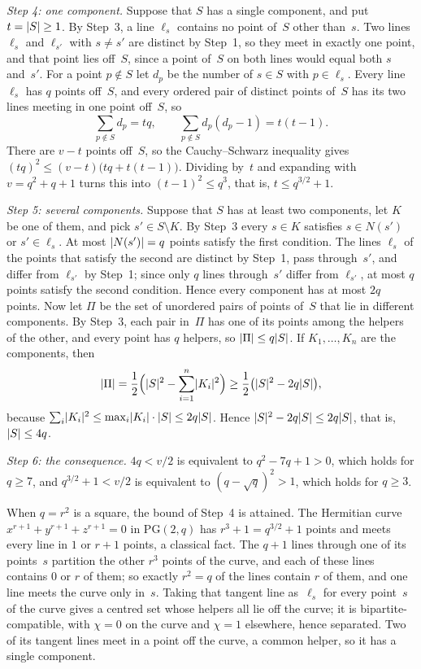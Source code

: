 \begin{outline}
\emph{Step 4: one component.} Suppose that $S$ has a single component, and put $t=\lvert S \rvert\ge1$. By Step~3, a line
$\ell_s$ contains no point of~$S$ other than~$s$. Two lines $\ell_s$ and $\ell_{s'}$ with $s\ne s'$ are distinct by
Step~1, so they meet in exactly one point, and that point lies off~$S$, since a point of~$S$ on both lines would equal
both $s$ and~$s'$. For a point $p\notin S$ let $d_p$ be the number of $s\in S$ with $p\in\ell_s$. Every line $\ell_s$ has
$q$ points off~$S$, and every ordered pair of distinct points of~$S$ has its two lines meeting in one point off~$S$, so
\[
 \sum_{p\notin S}d_p=tq,\qquad\sum_{p\notin S}d_p(d_p-1)=t(t-1).
\]
There are $v-t$ points off~$S$, so the Cauchy--Schwarz inequality gives $(tq)^2\le(v-t)\bigl(tq+t(t-1)\bigr)$. Dividing
by~$t$ and expanding with $v=q^2+q+1$ turns this into $(t-1)^2\le q^3$, that is, $t\le q^{3/2}+1$.

\emph{Step 5: several components.} Suppose that $S$ has at least two components, let $K$ be one of them, and pick
$s'\in S\setminus K$. By Step~3 every $s\in K$ satisfies $s\in N(s')$ or $s'\in\ell_s$. At most $\lvert N(s') \rvert=q$ points
satisfy the first condition. The lines $\ell_s$ of the points that satisfy the second are distinct by Step~1, pass
through~$s'$, and differ from $\ell_{s'}$ by Step~1; since only $q$ lines through~$s'$ differ from $\ell_{s'}$, at most $q$
points satisfy the second condition. Hence every component has at most $2q$ points. Now let $\Pi$ be the set of unordered
pairs of points of~$S$ that lie in different components. By Step~3, each pair in~$\Pi$ has one of its points among the
helpers of the other, and every point has $q$ helpers, so $\lvert \Pi \rvert\le q\lvert S \rvert$. If $K_1,\dots,K_n$ are the components,
then
\[
 \lvert \Pi \rvert=\frac12\Bigl(\lvert S \rvert^2-\sum_{i=1}^n\lvert K_i \rvert^2\Bigr)\ge\frac12\bigl(\lvert S \rvert^2-2q\lvert S \rvert\bigr),
\]
because $\sum_i\lvert K_i \rvert^2\le\max_i\lvert K_i \rvert\cdot\lvert S \rvert\le2q\lvert S \rvert$. Hence $\lvert S \rvert^2-2q\lvert S \rvert\le2q\lvert S \rvert$, that
is, $\lvert S \rvert\le4q$.

\emph{Step 6: the consequence.} $4q<v/2$ is equivalent to $q^2-7q+1>0$, which holds for $q\ge7$, and
$q^{3/2}+1<v/2$ is equivalent to $(q-\sqrt q)^2>1$, which holds for $q\ge3$.
\end{outline}

\begin{remark}\label{rem:PG-unital}
When $q=r^2$ is a square, the bound of Step~4 is attained. The Hermitian curve $x^{r+1}+y^{r+1}+z^{r+1}=0$ in
$\mathrm{PG}(2,q)$ has $r^3+1=q^{3/2}+1$ points and meets every line in $1$ or $r+1$ points, a classical fact. The $q+1$
lines through one of its points~$s$ partition the other $r^3$ points of the curve, and each of these lines contains $0$ or
$r$ of them; so exactly $r^2=q$ of the lines contain $r$ of them, and one line meets the curve only in~$s$. Taking that
tangent line as~$\ell_s$ for every point~$s$ of the curve gives a centred set whose helpers all lie off the curve; it is
bipartite-compatible, with $\chi=0$ on the curve and $\chi=1$ elsewhere, hence separated. Two of its tangent lines meet
in a point off the curve, a common helper, so it has a single component.
\end{remark}

